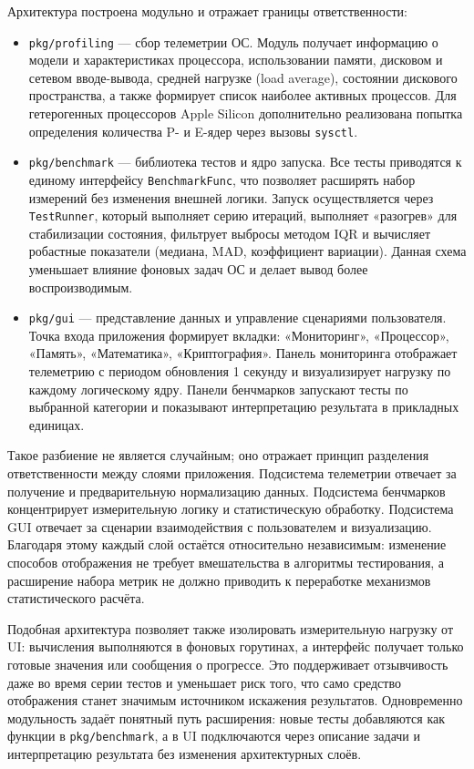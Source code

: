 Архитектура построена модульно и отражает границы ответственности:
\begin{itemize}
    \item \texttt{pkg/profiling} --- сбор телеметрии ОС. Модуль получает информацию о модели и характеристиках процессора, использовании памяти, дисковом и сетевом вводе-вывода, средней нагрузке (load average), состоянии дискового пространства, а также формирует список наиболее активных процессов. Для гетерогенных процессоров Apple Silicon дополнительно реализована попытка определения количества P- и E-ядер через вызовы \texttt{sysctl}.
    \item \texttt{pkg/benchmark} --- библиотека тестов и ядро запуска. Все тесты приводятся к единому интерфейсу \texttt{BenchmarkFunc}, что позволяет расширять набор измерений без изменения внешней логики. Запуск осуществляется через \texttt{TestRunner}, который выполняет серию итераций, выполняет «разогрев» для стабилизации состояния, фильтрует выбросы методом IQR и вычисляет робастные показатели (медиана, MAD, коэффициент вариации). Данная схема уменьшает влияние фоновых задач ОС и делает вывод более воспроизводимым.
    \item \texttt{pkg/gui} --- представление данных и управление сценариями пользователя. Точка входа приложения формирует вкладки: «Мониторинг», «Процессор», «Память», «Математика», «Криптография». Панель мониторинга отображает телеметрию с периодом обновления 1 секунду и визуализирует нагрузку по каждому логическому ядру. Панели бенчмарков запускают тесты по выбранной категории и показывают интерпретацию результата в прикладных единицах.
\end{itemize}

Такое разбиение не является случайным; оно отражает принцип разделения ответственности между слоями приложения. Подсистема телеметрии отвечает за получение и предварительную нормализацию данных. Подсистема бенчмарков концентрирует измерительную логику и статистическую обработку. Подсистема GUI отвечает за сценарии взаимодействия с пользователем и визуализацию. Благодаря этому каждый слой остаётся относительно независимым: изменение способов отображения не требует вмешательства в алгоритмы тестирования, а расширение набора метрик не должно приводить к переработке механизмов статистического расчёта.

Подобная архитектура позволяет также изолировать измерительную нагрузку от UI: вычисления выполняются в фоновых горутинах, а интерфейс получает только готовые значения или сообщения о прогрессе. Это поддерживает отзывчивость даже во время серии тестов и уменьшает риск того, что само средство отображения станет значимым источником искажения результатов. Одновременно модульность задаёт понятный путь расширения: новые тесты добавляются как функции в \texttt{pkg/benchmark}, а в UI подключаются через описание задачи и интерпретацию результата без изменения архитектурных слоёв.

